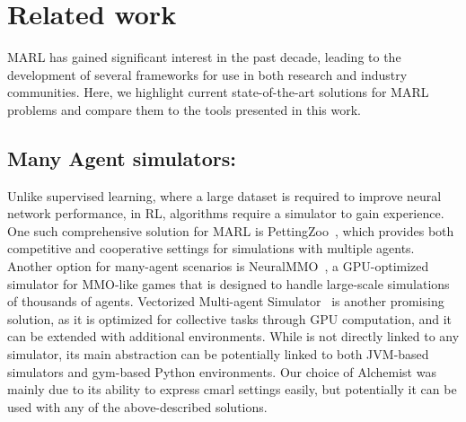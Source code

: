 \section{Related work}\label{coordination2023:sec:related}
MARL has gained significant interest in the past decade, 
 leading to the development of several frameworks 
 for use in both research and industry communities. 
Here, we highlight current state-of-the-art solutions 
 for MARL problems and compare 
 them to the tools presented in this work.
\subsection{Many Agent simulators:}   
Unlike supervised learning, 
 where a large dataset is required to improve neural network performance, 
 in RL, algorithms require a simulator to gain experience. 
One such comprehensive solution for MARL is PettingZoo~\cite{NEURIPS2021_7ed2d345}, 
 which provides both competitive and cooperative settings 
 for simulations with multiple agents. 
%
Another option for many-agent scenarios is NeuralMMO~\cite{https://doi.org/10.48550/arxiv.1903.00784}, 
 a GPU-optimized simulator for MMO-like games 
 that is designed to handle large-scale simulations of thousands of agents.
% 
Vectorized Multi-agent Simulator~\cite{bettini2022vmas} is another promising solution, 
 as it is optimized for collective tasks through GPU computation, 
 and it can be extended with additional environments.
%
While \scarlib is not directly linked to any simulator, 
 its main abstraction can be potentially linked 
 to both JVM-based simulators and gym-based Python environments. 
 Our choice of Alchemist was mainly due to its ability to express \ac{cmarl} settings easily, but potentially it can be used with any of the above-described solutions.
